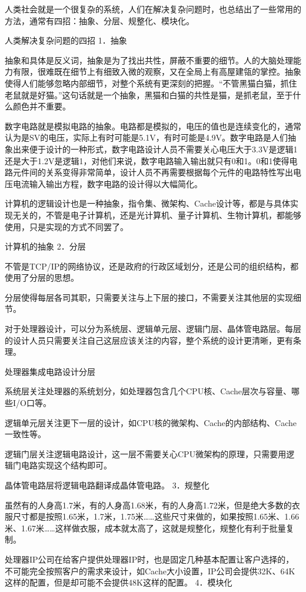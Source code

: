 \documentclass[12pt,UTF8]{ctexbook}
\begin{document}
人类社会就是一个很复杂的系统，人们在解决复杂问题时，也总结出了一些常用的方法，通常有四招：抽象、分层、规整化、模块化。

人类解决复杂问题的四招
1．抽象

抽象和具体是反义词，抽象是为了找出共性，屏蔽不重要的细节。人的大脑处理能力有限，很难既在细节上有细致入微的观察，又在全局上有高屋建瓴的掌控。抽象使得人们能够忽略内部细节，对整个系统有更深刻的把握。“不管黑猫白猫，抓住老鼠就是好猫。”这句话就是一个抽象，黑猫和白猫的共性是猫，是抓老鼠，至于什么颜色并不重要。

数字电路就是模拟电路的抽象。电路都是模拟的，电压的值也是连续变化的，通常认为是SV的电压，实际上有时可能是5.1V，有时可能是4.9V。数字电路是人们抽象出来便于设计的一种形式，数字电路设计人员不需要关心电压大于3.3V是逻辑1还是大于1.2V是逻辑1，对他们来说，数字电路输入输出就只有0和1。0和1使得电路元件间的关系变得非常简单，设计人员不再需要根据每个元件的电路特性写出电压电流输入输出方程，数字电路的设计得以大幅简化。

计算机的逻辑设计也是一种抽象，指令集、微架构、Cache设计等，都是与具体实现无关的，不管是电子计算机，还是光计算机、量子计算机、生物计算机，都能够使用，只是实现的方式不同罢了。

计算机的抽象
2．分层

不管是TCP/IP的网络协议，还是政府的行政区域划分，还是公司的组织结构，都使用了分层的思想。

分层使得每层各司其职，只需要关注与上下层的接口，不需要关注其他层的实现细节。

对于处理器设计，可以分为系统层、逻辑单元层、逻辑门层、晶体管电路层。每层的设计人员只需要关注自己这层应该关注的内容，整个系统的设计更清晰，更有条理。

处理器集成电路设计分层

系统层关注处理器的系统划分，如处理器包含几个CPU核、Cache层次与容量、哪些I/O口等。

逻辑单元层关注更下一层的设计，如CPU核的微架构、Cache的内部结构、Cache一致性等。

逻辑门层关注逻辑电路设计，这一层不需要关心CPU微架构的原理，只需要用逻辑门电路实现这个结构即可。

晶体管电路层将逻辑电路翻译成晶体管电路。
3．规整化

虽然有的人身高1.7米，有的人身高1.68米，有的人身高1.72米，但是绝大多数的衣服尺寸都是按照1.65米，1.7米，1.75米……这些尺寸来做的，如果按照1.65米、1.66米、1.67米……这样做衣服，成本就太高了，这就是规整化，规整化有利于批量复制。

处理器IP公司在给客户提供处理器IP时，也是固定几种基本配置让客户选择的，不可能完全按照客户的需求来设计，如Cache大小设置，IP公司会提供32K、64K这样的配置，但是却可能不会提供48K这样的配置。
4．模块化
\end{document}
